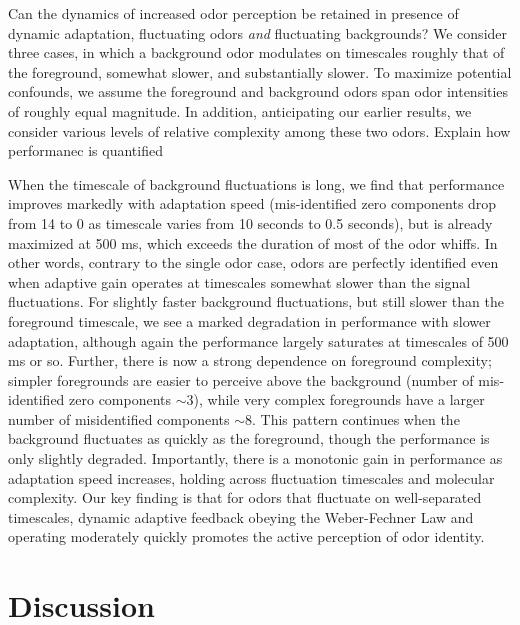 Can the dynamics of increased odor perception be retained in presence of dynamic adaptation, fluctuating odors \textit{and} fluctuating backgrounds? We consider three cases, in which a background odor modulates on timescales roughly that of the foreground, somewhat slower, and substantially slower. To maximize potential confounds, we assume the foreground and background odors span odor intensities of roughly equal magnitude. In addition, anticipating our earlier results, we consider various levels of relative complexity among these two odors. {\color{blue} Explain how performanec is quantified}

When the timescale of background fluctuations is long, we find that performance improves markedly with adaptation speed (mis-identified zero components drop from 14 to 0 as timescale varies from 10 seconds to 0.5 seconds), but is already maximized at 500 ms, which exceeds the duration of most of the odor whiffs. In other words, contrary to the single odor case, odors are perfectly identified even when adaptive gain operates at timescales somewhat slower than the signal fluctuations. For slightly faster background fluctuations, but still slower than the foreground timescale, we see a marked degradation in performance with slower adaptation, although again the performance largely saturates at timescales of 500 ms or so. Further, there is now a strong dependence on foreground complexity; simpler foregrounds are easier to perceive above the background (number of mis-identified zero components $\sim 3$), while very complex foregrounds have a larger number of misidentified components $\sim 8$. This pattern continues when the background fluctuates as quickly as the foreground, though the performance  is only slightly degraded. Importantly, there is a monotonic gain in performance as adaptation speed increases, holding across fluctuation timescales and molecular complexity. Our key finding is that for odors that fluctuate on well-separated timescales, dynamic adaptive feedback obeying the Weber-Fechner Law and operating moderately quickly promotes the active perception of odor identity. 


\section*{Discussion}

